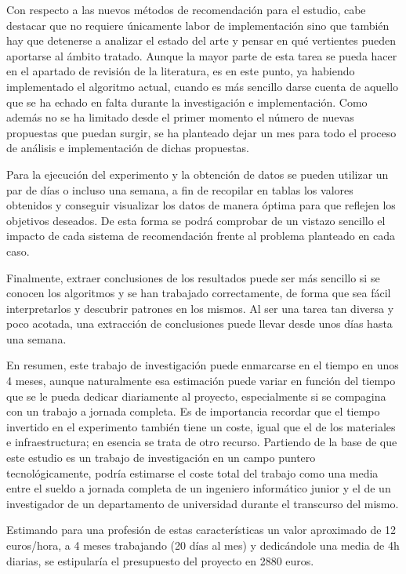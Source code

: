 Con respecto a las nuevos métodos de recomendación para el estudio, cabe destacar que no requiere únicamente labor de implementación sino que también hay que detenerse a analizar el estado del arte y pensar en qué vertientes pueden aportarse al ámbito tratado. Aunque la mayor parte de esta tarea se pueda hacer en el apartado de revisión de la literatura, es en este punto, ya habiendo implementado el algoritmo actual, cuando es más sencillo darse cuenta de aquello que se ha echado en falta durante la investigación e implementación. Como además no se ha limitado desde el primer momento el número de nuevas propuestas que puedan surgir, se ha planteado dejar un mes para todo el proceso de análisis e implementación de dichas propuestas.

Para la ejecución del experimento y la obtención de datos se pueden utilizar un par de días o incluso una semana, a fin de recopilar en tablas los valores obtenidos y conseguir visualizar los datos de manera óptima para que reflejen los objetivos deseados. De esta forma se podrá comprobar de un vistazo sencillo el impacto de cada sistema de recomendación frente al problema planteado en cada caso.

Finalmente, extraer conclusiones de los resultados puede ser más sencillo si se conocen los algoritmos y se han trabajado correctamente, de forma que sea fácil interpretarlos y descubrir patrones en los mismos. Al ser una tarea tan diversa y poco acotada, una extracción de conclusiones puede llevar desde unos días hasta una semana.

En resumen, este trabajo de investigación puede enmarcarse en el tiempo en unos 4 meses, aunque naturalmente esa estimación puede variar en función del tiempo que se le pueda dedicar diariamente al proyecto, especialmente si se compagina con un trabajo a jornada completa. Es de importancia recordar que el tiempo invertido en el experimento también tiene un coste, igual que el de los materiales e infraestructura; en esencia se trata de otro recurso. Partiendo de la base de que este estudio es un trabajo de investigación en un campo puntero tecnológicamente, podría estimarse el coste total del trabajo como una media entre el sueldo a jornada completa de un ingeniero informático junior y el de un investigador de un departamento de universidad durante el transcurso del mismo.

Estimando para una profesión de estas características un valor aproximado de 12 euros/hora, a 4 meses trabajando (20 días al mes) y dedicándole una media de 4h diarias, se estipularía el presupuesto del proyecto en 2880 euros.